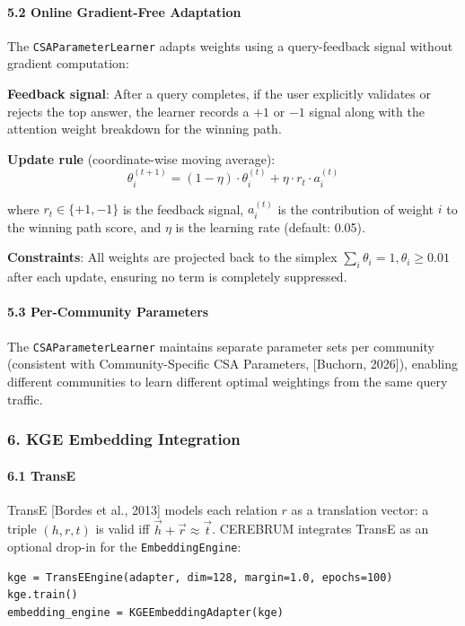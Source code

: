 \paragraph{5.2 Online Gradient-Free Adaptation}
The \texttt{CSAParameterLearner} adapts weights using a query-feedback signal without gradient computation:

\textbf{Feedback signal}: After a query completes, if the user explicitly validates or rejects the top answer, the learner records a $+1$ or $-1$ signal along with the attention weight breakdown for the winning path.

\textbf{Update rule} (coordinate-wise moving average):
\begin{equation}
\theta_i^{(t+1)} = (1 - \eta) \cdot \theta_i^{(t)} + \eta \cdot r_t \cdot a_i^{(t)}
\end{equation}

where $r_t \in \{+1, -1\}$ is the feedback signal, $a_i^{(t)}$ is the contr\-ibution of weight $i$ to the winning path score, and $\eta$ is the learning rate (default: 0.05).

\textbf{Constraints}: All weights are projected back to the simplex $\sum_i \theta_i = 1, \theta_i \geq 0.01$ after each update, ensuring no term is completely suppressed.

\paragraph{5.3 Per-Community Parameters}
The \texttt{CSAParameterLearner} maintains separate parameter sets per community (consistent with Community-Specific CSA Parameters, [Buchorn, 2026]), enabling different communities to learn different optimal weightings from the same query traffic.

\subsubsection{6. KGE Embedding Integration}

\paragraph{6.1 TransE}
TransE [Bordes et al., 2013] models each relation $r$ as a translation vector: a triple $(h, r, t)$ is valid iff $\vec{h} + \vec{r} \approx \vec{t}$. CEREBRUM integrates TransE as an optional drop-in for the \texttt{EmbeddingEngine}:

\begin{lstlisting}
kge = TransEEngine(adapter, dim=128, margin=1.0, epochs=100)
kge.train()
embedding_engine = KGEEmbeddingAdapter(kge)
\end{lstlisting}

